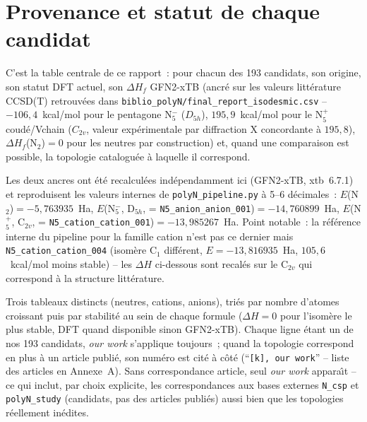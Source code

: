 \documentclass[11pt,a4paper]{article}
\begin{document}


\section{Provenance et statut de chaque candidat}
\label{sec:provenance}

C'est la table centrale de ce rapport~: pour chacun des 193 candidats,
son origine, son statut DFT actuel, son $\Delta H_f$ GFN2-xTB (ancr\'e sur
les valeurs litt\'erature CCSD(T) retrouv\'ees dans
\texttt{biblio\_polyN/final\_report\_isodesmic.csv} -- $-106{,}4$~kcal/mol
pour le pentagone N$_5^-$ ($D_{5h}$), $195{,}9$~kcal/mol pour le N$_5^+$
coud\'e/Vchain ($C_{2v}$, valeur exp\'erimentale par diffraction X
concordante \`a $195{,}8$), $\Delta H_f$(N$_2$)$=0$ pour les neutres par
construction) et, quand une comparaison est possible, la topologie
catalogu\'ee \`a laquelle il correspond.

Les deux ancres ont \'et\'e recalcul\'ees ind\'ependamment ici (GFN2-xTB,
xtb~6.7.1) et reproduisent les valeurs internes de
\texttt{polyN\_pipeline.py} \`a 5--6 d\'ecimales~: $E$(N$_2$)$=-5{,}763935$~Ha,
$E$(N$_5^-$, D$_{5h}$, = \texttt{N5\_anion\_anion\_001})$=-14{,}760899$~Ha,
$E$(N$_5^+$, C$_{2v}$, = \texttt{N5\_cation\_cation\_001})$=-13{,}985267$~Ha.
Point notable~: la r\'ef\'erence interne du pipeline pour la famille
cation n'est pas ce dernier mais \texttt{N5\_cation\_cation\_004}
(isom\`ere C$_1$ diff\'erent, $E=-13{,}816935$~Ha, $105{,}6$~kcal/mol moins
stable) -- les $\Delta H$ ci-dessous sont recal\'es sur le C$_{2v}$ qui
correspond \`a la structure litt\'erature.

Trois tableaux distincts (neutres, cations, anions), tri\'es par nombre
d'atomes croissant puis par stabilit\'e au sein de chaque formule
($\Delta H = 0$ pour l'isom\`ere le plus stable, DFT quand disponible sinon
GFN2-xTB). Chaque ligne \'etant un de nos 193 candidats, \emph{our work}
s'applique toujours~; quand la topologie correspond en plus \`a un article
publi\'e, son num\'ero est cit\'e \`a c\^ot\'e (``\texttt{[k], our work}''
-- liste des articles en Annexe~A). Sans correspondance article, seul
\emph{our work} appara\^\i t -- ce qui inclut, par choix explicite, les
correspondances aux bases externes \texttt{N\_csp} et \texttt{polyN\_study}
(candidats, pas des articles publi\'es) aussi bien que les topologies
r\'eellement in\'edites.
\end{document}
